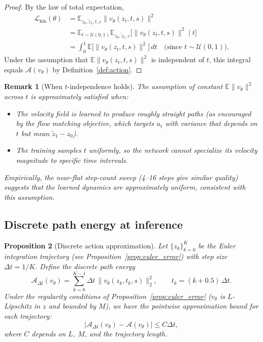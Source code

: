 \documentclass[letterpaper]{article}
\newtheorem{proposition}{Proposition}[section]
\newtheorem{remark}[proposition]{Remark}
\newcommand{\E}{\mathbb{E}}
\newcommand{\cA}{\mathcal{A}}
\newcommand{\cL}{\mathcal{L}}
\begin{document}
\begin{proof}
By the law of total expectation,
\begin{align}
    \cL_{\text{kin}}(\theta)
    &= \E_{z_0,\tilde z_1,t,\varepsilon} \|v_\theta(z_t, t, s)\|^2 \\
    &= \E_{t \sim \mathcal{U}(0,1)} \E_{z_0,\tilde z_1,\varepsilon}
        \bigl[ \|v_\theta(z_t, t, s)\|^2 \mid t \bigr] \\
    &= \int_0^1 \E\bigl[ \|v_\theta(z_t, t, s)\|^2 \bigr] \, dt \quad
        \text{(since $t \sim \mathcal{U}(0,1)$)}.
\end{align}
Under the assumption that $\E\|v_\theta(z_t, t, s)\|^2$ is independent of $t$,
this integral equals $\cA(v_\theta)$ by Definition~\ref{def:action}.
\end{proof}

\begin{remark}[When $t$-independence holds]
The assumption of constant $\E\|v_\theta\|^2$ across $t$ is approximately
satisfied when:
\begin{itemize}
    \item The velocity field is learned to produce roughly straight paths
    (as encouraged by the flow matching objective, which targets $u_t$ with
    variance that depends on $t$ but mean $\tilde z_1 - z_0$).
    \item The training samples $t$ uniformly, so the network cannot specialize
    its velocity magnitude to specific time intervals.
\end{itemize}
Empirically, the near-flat step-count sweep (4--16 steps give similar quality)
suggests that the learned dynamics are approximately uniform, consistent with
this assumption.
\end{remark}

\subsection{Discrete path energy at inference}

\begin{proposition}[Discrete action approximation]
\label{prop:discrete_action}
Let $\{z_k\}_{k=0}^K$ be the Euler integration trajectory (see
Proposition~\ref{prop:euler_error}) with step size $\Delta t = 1/K$.
Define the discrete path energy
\begin{equation}
    \cA_{\Delta t}(v_\theta) = \sum_{k=0}^{K-1} \Delta t \,
        \bigl\| v_\theta(z_k, t_k, s) \bigr\|_2^2,
    \qquad t_k = (k + 0.5)\, \Delta t.
    \label{eq:discrete_action}
\end{equation}
Under the regularity conditions of Proposition~\ref{prop:euler_error}
($v_\theta$ is $L$-Lipschitz in $z$ and bounded by $M$), we have the
pointwise approximation bound for each trajectory:
\begin{equation}
    \bigl| \cA_{\Delta t}(v_\theta) - \cA(v_\theta) \bigr| \leq C \Delta t,
    \label{eq:discrete_action_bound}
\end{equation}
where $C$ depends on $L$, $M$, and the trajectory length.
\end{proposition}
\end{document}
